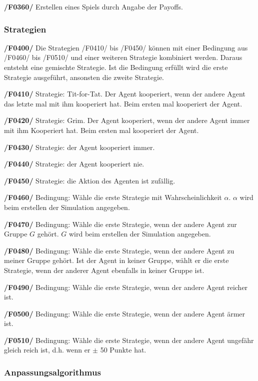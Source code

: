\textbf{/F0360/} 
Erstellen eines Spiels durch Angabe der Payoffs.

\subsubsection{Strategien}

\textbf{/F0400/}
Die Strategien /F0410/ bis /F0450/ können mit einer Bedingung aus /F0460/ bis /F0510/ und einer weiteren Strategie kombiniert werden. Daraus entsteht eine gemischte Strategie. Ist die Bedingung erfüllt wird die erste Strategie ausgeführt, ansonsten die zweite Strategie.  

\textbf{/F0410/} 
Strategie: Tit-for-Tat. Der Agent kooperiert, wenn der andere Agent das letzte mal mit ihm kooperiert hat. Beim ersten mal kooperiert der Agent.

\textbf{/F0420/} 
Strategie: Grim. Der Agent kooperiert, wenn der andere Agent immer mit ihm Kooperiert hat. Beim ersten mal kooperiert der Agent.

\textbf{/F0430/} 
Strategie: der Agent kooperiert immer.

\textbf{/F0440/}
Strategie: der Agent kooperiert nie.

\textbf{/F0450/}
Strategie: die Aktion des Agenten ist zufällig.

\textbf{/F0460/}
Bedingung: Wähle die erste Strategie mit Wahrscheinlichkeit $\alpha$. $\alpha$ wird beim erstellen der Simulation angegeben.

\textbf{/F0470/}
Bedingung: Wähle die erste Strategie, wenn der andere Agent zur Gruppe $G$ gehört. $G$ wird beim erstellen der Simulation angegeben.

\textbf{/F0480/}
Bedingung: Wähle die erste Strategie, wenn der andere Agent zu meiner Gruppe gehört. Ist der Agent in keiner Gruppe, wählt er die erste Strategie, wenn der anderer Agent ebenfalls in keiner Gruppe ist.

\textbf{/F0490/}
Bedingung: Wähle die erste Strategie, wenn der andere Agent reicher ist.

\textbf{/F0500/}
Bedingung: Wähle die erste Strategie, wenn der andere Agent ärmer ist.

\textbf{/F0510/}
Bedingung: Wähle die erste Strategie, wenn der andere Agent ungefähr gleich reich ist, d.h. wenn er $\pm$ 50 Punkte hat. 

\subsubsection{Anpassungsalgorithmus}

